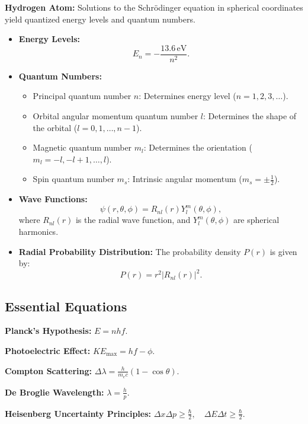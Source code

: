 \documentclass{article}
\newcommand{\eqbox}[1]{\begin{tcolorbox}[colback=gray!10] #1 \end{tcolorbox}}
\newcommand{\conceptbox}[1]{\begin{tcolorbox}[colback=blue!10] #1 \end{tcolorbox}}
\begin{document}
\conceptbox{
\textbf{Hydrogen Atom:} Solutions to the Schrödinger equation in spherical coordinates yield quantized energy levels and quantum numbers.

\begin{itemize}
    \item \textbf{Energy Levels:} 
    \[
    E_n = -\frac{13.6 \, \text{eV}}{n^2}.
    \]

    \item \textbf{Quantum Numbers:}
    \begin{itemize}
        \item Principal quantum number \( n \): Determines energy level (\( n = 1, 2, 3, \dots \)).
        \item Orbital angular momentum quantum number \( l \): Determines the shape of the orbital (\( l = 0, 1, \dots, n-1 \)).
        \item Magnetic quantum number \( m_l \): Determines the orientation (\( m_l = -l, -l+1, \dots, l \)).
        \item Spin quantum number \( m_s \): Intrinsic angular momentum (\( m_s = \pm \frac{1}{2} \)).
    \end{itemize}

    \item \textbf{Wave Functions:}
    \[
    \psi(r, \theta, \phi) = R_{nl}(r)Y_l^m(\theta, \phi),
    \]
    where \( R_{nl}(r) \) is the radial wave function, and \( Y_l^m(\theta, \phi) \) are spherical harmonics.

    \item \textbf{Radial Probability Distribution:}
    The probability density \( P(r) \) is given by:
    \[
    P(r) = r^2|R_{nl}(r)|^2.
    \]
\end{itemize}
}
\subsection{Essential Equations}

\eqbox{
\textbf{Planck's Hypothesis:} \( E = nhf \).
}

\eqbox{
\textbf{Photoelectric Effect:} \( KE_{\text{max}} = hf - \phi \).
}

\eqbox{
\textbf{Compton Scattering:} \( \Delta \lambda = \frac{h}{m_e c} (1 - \cos\theta) \).
}

\eqbox{
\textbf{De Broglie Wavelength:} \( \lambda = \frac{h}{p} \).
}

\eqbox{
\textbf{Heisenberg Uncertainty Principles:} \( \Delta x \Delta p \geq \frac{\hbar}{2}, \quad \Delta E \Delta t \geq \frac{\hbar}{2} \).
}
\end{document}
